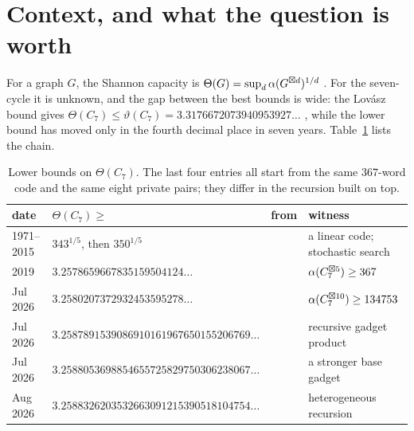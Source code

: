\section{Context, and what the question is worth}
\label{sec:intro}

For a graph $G$, the Shannon capacity is $\Theta(G)=\sup_d \alpha(G^{\boxtimes d})^{1/d}$
\cite{shannon1956}. For the seven-cycle it is unknown, and the gap between the best bounds
is wide: the Lov\'asz bound gives
$\Theta(C_7)\le\vartheta(C_7)=3.3176672073940953927\ldots$ \cite{lovasz1979}, while the
lower bound has moved only in the fourth decimal place in seven years. Table~\ref{tab:chain}
lists the chain.

\begin{table}[ht]
\centering\small
\begin{tabular}{@{}llll@{}}
\toprule
date & $\Theta(C_7)\ge$ & from & witness \\
\midrule
1971--2015 & $343^{1/5}$, then $350^{1/5}$ & \cite{baumert1971,mathew2017} & a linear code; stochastic search \\
2019 & $3.2578659667835159504124\ldots$ & \cite{polak2019} & $\alpha(C_7^{\boxtimes 5})\ge 367$ \\
Jul 2026 & $3.2580207372932453595278\ldots$ & \cite{itty2026} & $\alpha(C_7^{\boxtimes 10})\ge 134753$ \\
Jul 2026 & $3.2587891539086910161967650155206769\ldots$ & \cite{gao2026} & recursive gadget product \\
Jul 2026 & $3.2588053698854655725829750306238067\ldots$ & \cite{bpz2026} & a stronger base gadget \\
Aug 2026 & $3.2588326203532663091215390518104754\ldots$ & \cite{tandon2026} & heterogeneous recursion \\
\bottomrule
\end{tabular}
\caption{Lower bounds on $\Theta(C_7)$. The last four entries all start from the same
$367$-word code and the same eight private pairs; they differ in the recursion built on
top.}
\label{tab:chain}
\end{table}

